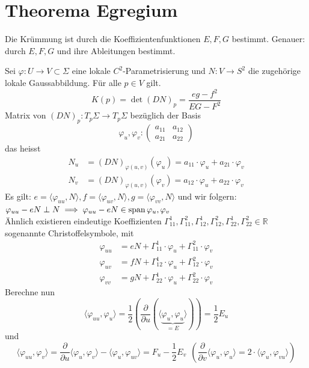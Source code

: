 \documentclass[../main.tex]{subfiles}
\begin{document}
\section{Theorema Egregium}
\begin{goal}
    Die Krümmung ist durch die Koeffizientenfunktionen $E,F,G$ bestimmt. Genauer: durch $E,F,G$ und ihre Ableitungen bestimmt.
\end{goal}
Sei $\varphi:U\to V \subset \Sigma$ eine lokale $C^{2}$-Parametrisierung und $N:V\to S^{2}$ die zugehörige lokale Gaussabbildung.
Für alle $p\in V$ gilt. $$K(p) = \det(DN)_{p} = \frac{eg-f^{2}}{EG-F^{2}}$$
Matrix von $(DN)_{p}:T_{p}\Sigma\to T_{p}\Sigma$ bezüglich der Basis $${\varphi_{u},\varphi_{v}}: \begin{pmatrix}
    a_{11} & a_{12}\\ a_{21} & a_{22} \end{pmatrix}$$ das heisst \begin{align*}
        N_{u} &= (DN)_{\varphi(u,v)}(\varphi_{u}) = a_{11}\cdot \varphi_{u} + a_{21}\cdot\varphi_{v}\\
        N_{v} &= (DN)_{\varphi(u,v)}(\varphi_{v}) = a_{12}\cdot \varphi_{u} + a_{22}\cdot\varphi_{v}
    \end{align*}
Es gilt: $e = \langle\varphi_{uu}, N\rangle, f = \langle\varphi_{uv}, N\rangle, g = \langle\varphi_{vv}, N\rangle$ und wir folgern: $\varphi_{uu}-eN\perp N\\ \implies \varphi_{uu}-eN \in \operatorname{span}{{\varphi_{u},\varphi_{v}}}$\\
Ähnlich existieren eindeutige Koeffizienten $\Gamma_{11}^{1},\Gamma_{11}^{2},\Gamma_{12}^{1},\Gamma_{12}^{2},\Gamma_{22}^{1},\Gamma_{22}^{2}\in\mathbb{R}$ sogenannte Christoffelsymbole, mit \begin{align*}
    \varphi_{uu} &= eN + \Gamma_{11}^{1}\cdot\varphi_{u} + \Gamma_{11}^{2}\cdot\varphi_{v}\\
    \varphi_{uv} &= fN + \Gamma_{12}^{1}\cdot\varphi_{u} + \Gamma_{12}^{2}\cdot\varphi_{v}\\
    \varphi_{vv} &= gN + \Gamma_{22}^{1}\cdot\varphi_{u} + \Gamma_{22}^{2}\cdot\varphi_{v}
\end{align*} Berechne nun $$\langle\varphi_{uu},\varphi_{u}\rangle = \frac{1}{2}(\frac{\partial}{\partial u}(\langle\underbrace{\varphi_{u},\varphi_{u}}_{=E}\rangle)) = \frac{1}{2}E_{u}$$ und 
$$\langle\varphi_{uu},\varphi_{v}\rangle = \frac{\partial}{\partial u}\langle\varphi_{u},\varphi_{v}\rangle - \langle\varphi_{u},\varphi_{uv}\rangle = F_{u} - \frac{1}{2}E_{v} \ \ (\frac{\partial}{\partial v}\langle\varphi_{u},\varphi_{u}\rangle = 2\cdot\langle\varphi_{u},\varphi_{vu}\rangle)$$
\end{document}

